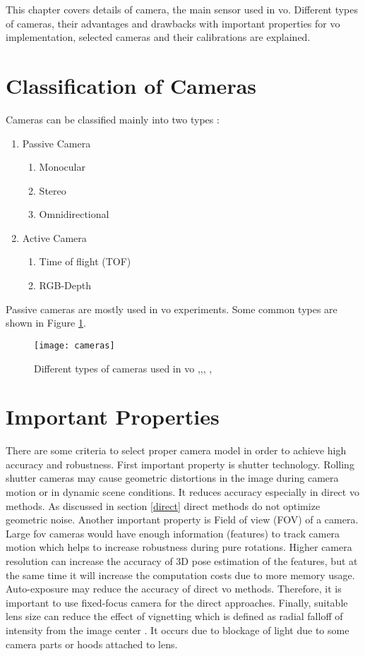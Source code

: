 This chapter covers details of camera, the main sensor used in \acrshort{vo}. Different types of cameras, their advantages and drawbacks with important properties for \acrshort{vo} implementation, selected cameras and their calibrations are explained. 

\section{Classification of Cameras}
Cameras can be classified mainly into two types :
\begin{enumerate}
	\item Passive Camera
	\begin{enumerate}
		\item Monocular
		\item Stereo
		\item Omnidirectional
	\end{enumerate}
	\item Active Camera
	\begin{enumerate}
		\item Time of flight (TOF)
		\item RGB-Depth
	\end{enumerate}
\end{enumerate}
Passive cameras are mostly used in \acrshort{vo} experiments. Some common types are shown in Figure \ref{fig:cameras}.
\begin{figure}[h]
	\centering
	\texttt{[image: cameras]}
	\caption{Different types of cameras used in \acrshort{vo} \cite{ids},\cite{kinect},\cite{zed}, \cite{omni},\cite{tof}}
	\label{fig:cameras}
\end{figure}

\section{Important Properties}
There are some criteria to select proper camera model in order to achieve high accuracy and robustness. First important property is shutter technology. Rolling shutter cameras may cause geometric distortions in the image during camera motion or in dynamic scene conditions. It reduces accuracy especially in direct \acrshort{vo} methods. As discussed in section \ref{direct} direct methods do not optimize geometric noise. Another important property is Field of view (FOV) of a camera. Large \acrshort{fov} cameras would have enough information (features) to track camera motion which helps to increase robustness during pure rotations. Higher camera resolution can increase the accuracy of 3D pose estimation of the features, but at the same time it will increase the computation costs due to more memory usage. Auto-exposure may reduce the accuracy of direct \acrshort{vo} methods. Therefore, it is important to use fixed-focus camera for the direct approaches. Finally, suitable lens size can reduce the effect of vignetting which is defined as radial falloff of intensity from the image center \cite{vignette}. It occurs due to blockage of light due to some camera parts or hoods attached to lens.

